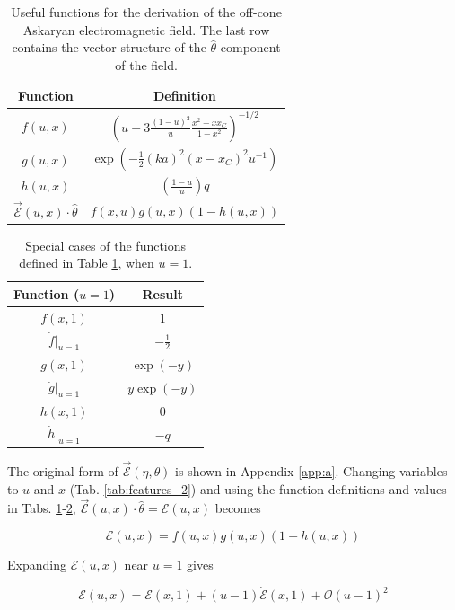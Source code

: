 \documentclass[amsmath,amssymb,aps,prd,10pt,twocolumn]{revtex4}
\begin{document}
\begin{table}
\renewcommand{\arraystretch}{2}
\begin{tabular}{| c | c |} \hline
Function & Definition \\ \hline
$f(u,x)$ & $\left( u + 3 \frac{(1-u)^2}{u} \frac{x^2 - x x_C}{1-x^2} \right)^{-1/2}$ \\
$g(u,x)$ & $\exp \left( -\frac{1}{2}(ka)^2 (x - x_C)^2 u^{-1} \right)$ \\
$h(u,x)$ & $\left( \frac{1-u}{u} \right) q$ \\
$\vec{\mathcal{E}}(u,x) \cdot \hat{\theta}$ & $f(x,u) g(u,x)(1 - h(u,x))$ \\ \hline
\end{tabular}
\caption{\label{tab:features_3} Useful functions for the derivation of the off-cone Askaryan electromagnetic field.  The last row contains the vector structure of the $\hat{\theta}$-component of the field.}
\end{table}

\begin{table}
\begin{tabular}{| c | c |} \hline
Function ($u = 1$) & Result \\ \hline
$f(x,1)$ & $1$ \\
$\dot{f}|_{u = 1}$ & $-\frac{1}{2}$ \\
$g(x,1)$ & $\exp(-y)$ \\
$\dot{g}|_{u = 1}$ & $y \exp(-y)$ \\
$h(x,1)$ & $0$ \\
$\dot{h}|_{u = 1}$ & $-q$ \\ \hline
\end{tabular}
\caption{\label{tab:features_4} Special cases of the functions defined in Table \ref{tab:features_3}, when $u = 1$.}
\end{table}

The original form of $\vec{\mathcal{E}}(\eta,\theta)$ is shown in Appendix \ref{app:a}.  Changing variables to $u$ and $x$ (Tab. \ref{tab:features_2}) and using the function definitions and values in Tabs. \ref{tab:features_3}-\ref{tab:features_4}, $\vec{\mathcal{E}}(u,x) \cdot \hat{\theta} = \mathcal{E}(u,x)$ becomes

\begin{equation}
\mathcal{E}(u,x) = f(u,x) g(u,x) (1 - h(u,x))
\end{equation}

Expanding $\mathcal{E}(u,x)$ near $u = 1$ gives

\begin{equation}
\mathcal{E}(u,x) = \mathcal{E}(x,1) + (u-1) \dot{\mathcal{E}}(x,1) + \mathcal{O}(u-1)^2 \label{eq:expand}
\end{equation}
\end{document}

